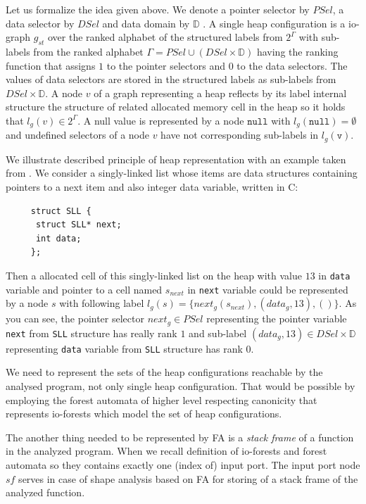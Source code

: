 Let us formalize the idea given above.
We denote a pointer selector by $PSel$, a data selector by $DSel$ and data domain by $\mathbb{D}$ \cite{techrep}.
A single heap configuration is a io-graph $g_{st}$ over the ranked alphabet of the structured labels from $2^\Gamma$
with sub-labels from the ranked alphabet $\Gamma = PSel \cup (DSel \times \mathbb{D})$ having the
ranking function that assigns $1$ to the pointer selectors and $0$ to the data selectors.
The values of data selectors are stored in the structured labels as sub-labels from $DSel \times \mathbb{D}$.
A node $v$ of a graph representing a heap reflects by its label internal structure the structure of
related allocated memory cell in the heap so it holds that $l_g(v) \in 2^\Gamma$.
A null value is represented by a node $\texttt{null}$ with $l_g(\texttt{null}) = \emptyset$
and undefined selectors of a node $v$ have not corresponding  sub-labels in $l_g(\texttt{v})$.

\bexmp
We illustrate described principle of heap representation with an example taken from \cite{techrep}.
We consider a singly-linked list whose items are data structures containing pointers to
a next item and also integer data variable, written in C:
\begin{center}
\begin{minipage}{0.3\textwidth}
    \begin{verbatim}
     struct SLL {
      struct SLL* next;
      int data;
     };
    \end{verbatim}
\end{minipage}
\end{center}
Then a allocated cell of this singly-linked list on the heap with value $13$ in \texttt{data} variable and pointer to a cell named $s_{next}$
in \texttt{next} variable could be represented
by a node $s$ with following label $l_g(s) = \{next_g(s_{next}),(data_g,13),()\}$.
As you can see, the pointer selector $next_g \in PSel$ representing the pointer variable \texttt{next} from \texttt{SLL} structure
has really rank $1$ and sub-label $(data_g,13) \in DSel\times \mathbb{D}$ representing \texttt{data} variable from \texttt{SLL} structure
has rank $0$.
\eexmp

We need to represent the sets of the heap configurations reachable by the analysed program, not only single heap configuration.
That would be possible by employing the forest automata of higher level respecting canonicity that represents io-forests
which model the set of heap configurations.

The another thing needed to be represented by FA is a \emph{stack frame} of a function in the analyzed program.
When we recall definition of io-forests and forest automata so they contains exactly one (index of) input port.
The input port node $sf$ serves in case of shape analysis based on FA for storing of a stack frame of the analyzed function.

